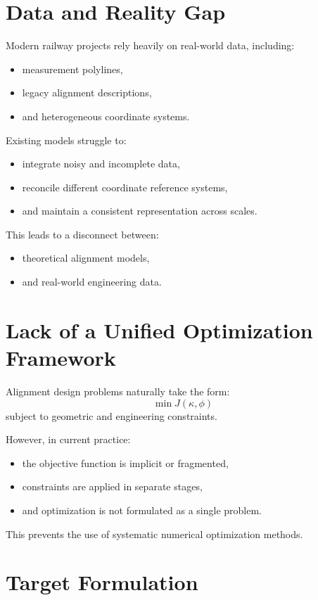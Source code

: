 \section{Data and Reality Gap}

Modern railway projects rely heavily on real-world data, including:
\begin{itemize}
\item measurement polylines,
\item legacy alignment descriptions,
\item and heterogeneous coordinate systems.
\end{itemize}

Existing models struggle to:
\begin{itemize}
\item integrate noisy and incomplete data,
\item reconcile different coordinate reference systems,
\item and maintain a consistent representation across scales.
\end{itemize}

This leads to a disconnect between:
\begin{itemize}
\item theoretical alignment models,
\item and real-world engineering data.
\end{itemize}

\section{Lack of a Unified Optimization Framework}

Alignment design problems naturally take the form:
\[
\min J(\kappa,\phi)
\]
subject to geometric and engineering constraints.

However, in current practice:
\begin{itemize}
\item the objective function is implicit or fragmented,
\item constraints are applied in separate stages,
\item and optimization is not formulated as a single problem.
\end{itemize}

This prevents the use of systematic numerical optimization methods.

\section{Target Formulation}


